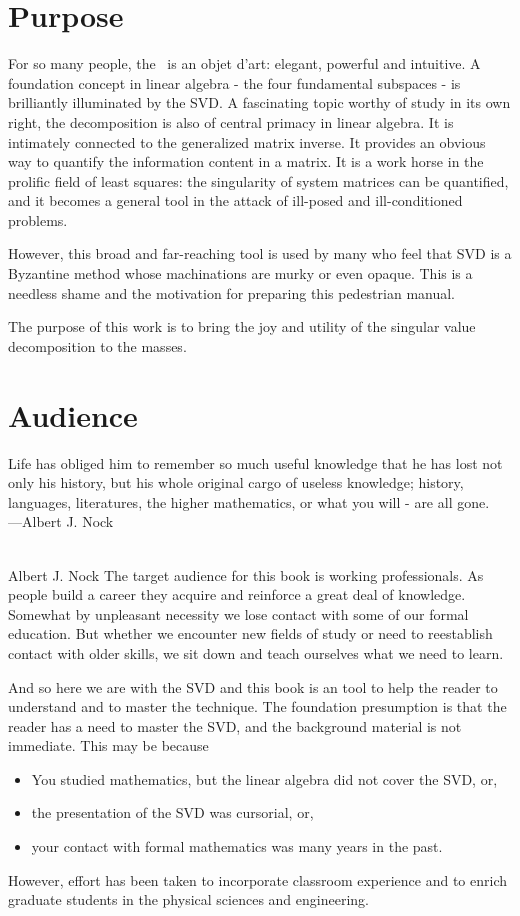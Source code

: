 \begin{thepreface}

\section*{Purpose}
For so many people, the \svdp \ is an objet d'art: elegant, powerful and intuitive. A foundation concept in linear algebra - the four fundamental subspaces - is brilliantly illuminated by the SVD. A fascinating topic worthy of study in its own right, the decomposition is also of central primacy in linear algebra. It is intimately connected to the generalized matrix inverse. It provides an obvious way to quantify the information content in a matrix. It is a work horse in the prolific field of least squares: the singularity of system matrices can be quantified, and it becomes a general tool in the attack of ill-posed and ill-conditioned problems.

However, this broad and far-reaching tool is used by many who feel that SVD is a Byzantine method whose machinations are murky or even opaque. This is a needless shame and the motivation for preparing this pedestrian manual.

The purpose of this work is to bring the joy and utility of the singular value decomposition to the masses.

\section*{Audience}
\begin{chapterquote}[20pt]
Life has obliged him to remember so much useful knowledge that he has lost not only his history, but his whole original cargo of useless knowledge; history, languages, literatures, the higher mathematics, or what you will - are all gone. \\
---{\upshape Albert J. Nock}
\end{chapterquote}
\ \\
Albert J. Nock 
The target audience for this book is working professionals. As people build a career they acquire and reinforce a great deal of knowledge. Somewhat by unpleasant necessity we lose contact with some of our formal education. But whether we encounter new fields of study or need to reestablish contact with older skills, we sit down and teach ourselves what we need to learn.

And so here we are with the SVD and this book is an tool to help the reader to understand and to master the technique. The foundation presumption is that the reader has a need to master the SVD, and the background material is not immediate. This may be because
\begin{itemize}
\item You studied mathematics, but the linear algebra did not cover the SVD, or,
\item the presentation of the SVD was cursorial, or,
\item your contact with formal mathematics was many years in the past.
\end{itemize}
However, effort has been taken to incorporate classroom experience and to enrich graduate students in the physical sciences and engineering.


\end{thepreface}
